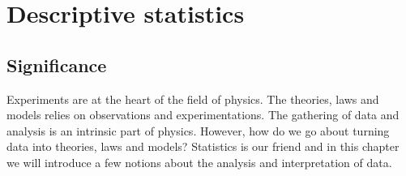 %
%
%
%
%
%
%
%
%
%


%
%
%
%
%
%
%
%
%
%
%
%
%

\chapter{Descriptive statistics}
\label{descriptive}
\section{Significance}

Experiments are at the heart of the field of physics. The theories, laws and models relies on observations and experimentations. The gathering of data and analysis is an intrinsic part of physics. However, how do we go about turning data into theories, laws and models? Statistics is our friend  and in this chapter we will introduce a few notions about the analysis and interpretation of data. 

